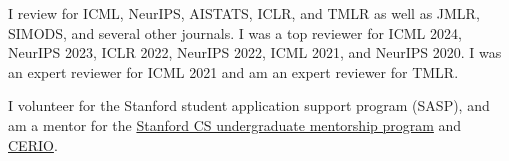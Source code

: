 \documentclass[10pt]{article}
\begin{document}
I review for ICML, NeurIPS, AISTATS, ICLR, and TMLR as well as
JMLR, SIMODS, and several other journals.
I was a top reviewer for ICML 2024, NeurIPS 2023, ICLR 2022, NeurIPS 2022, ICML
2021, and NeurIPS 2020.
I was an expert reviewer for ICML 2021 and am an expert reviewer for TMLR.

I volunteer for the Stanford student application support program (SASP), and
am a mentor for the \href{https://stanfordcsmentoring.com}{Stanford CS
    undergraduate mentorship program} and
\href{https://serio.stanford.edu}{CERIO}.


\end{document}
